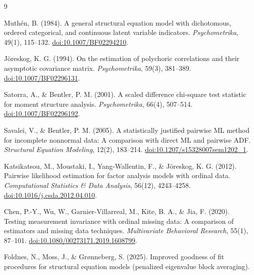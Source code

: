 \documentclass[11pt]{article}
\theoremstyle{plain}
\theoremstyle{remark}
\begin{document}
\begin{thebibliography}{9}

 Muth\'en, B. (1984). A general structural equation model
with dichotomous, ordered categorical, and continuous latent variable
indicators. \emph{Psychometrika}, 49(1), 115--132.
\href{https://doi.org/10.1007/BF02294210}{doi:10.1007/BF02294210}.

 J\"oreskog, K. G. (1994). On the estimation of polychoric
correlations and their asymptotic covariance matrix. \emph{Psychometrika},
59(3), 381--389. \href{https://doi.org/10.1007/BF02296131}{doi:10.1007/BF02296131}.

 Satorra, A., \& Bentler, P. M. (2001). A scaled
difference chi-square test statistic for moment structure analysis.
\emph{Psychometrika}, 66(4), 507--514.
\href{https://doi.org/10.1007/BF02296192}{doi:10.1007/BF02296192}.

 Savalei, V., \& Bentler, P. M. (2005). A
statistically justified pairwise ML method for incomplete nonnormal data: A
comparison with direct ML and pairwise ADF. \emph{Structural Equation
Modeling}, 12(2), 183--214.
\href{https://doi.org/10.1207/s15328007sem1202_1}{doi:10.1207/s15328007sem1202\_1}.

 Katsikatsou, M., Moustaki, I., Yang-Wallentin, F., \&
J\"oreskog, K. G. (2012). Pairwise likelihood estimation for factor analysis
models with ordinal data. \emph{Computational Statistics \& Data Analysis},
56(12), 4243--4258.
\href{https://doi.org/10.1016/j.csda.2012.04.010}{doi:10.1016/j.csda.2012.04.010}.

 Chen, P.-Y., Wu, W., Garnier-Villarreal, M., Kite, B. A., \&
Jia, F. (2020). Testing measurement invariance with ordinal missing data: A
comparison of estimators and missing data techniques. \emph{Multivariate
Behavioral Research}, 55(1), 87--101.
\href{https://doi.org/10.1080/00273171.2019.1608799}{doi:10.1080/00273171.2019.1608799}.

 Foldnes, N., Moss, J., \& Gr\o nneberg, S. (2025). Improved
goodness of fit procedures for structural equation models (penalized eigenvalue
block averaging).

\end{thebibliography}
\end{document}
